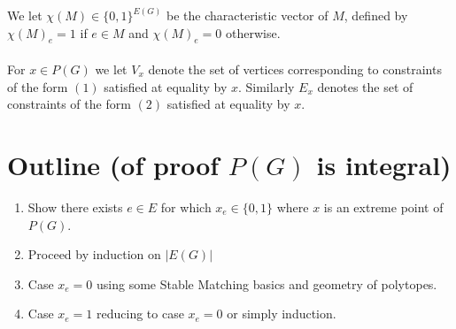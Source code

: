 \documentclass[letterpaper,12pt,oneside,onecolumn]{article}
\begin{document}
\paragraph{}
We let $\chi(M) \in \{0,1\}^{E(G)}$ be the characteristic vector of $M$, defined by $\chi(M)_e = 1$ if $e\in M$ and $\chi(M)_e = 0$ otherwise.
\paragraph{}
For $x \in P(G)$ we let $V_x$ denote the set of vertices corresponding to constraints of the form $(1)$ satisfied at equality by $x$. Similarly $E_x$ denotes the set of constraints of the form $(2)$ satisfied at equality by $x$.
\section*{Outline (of proof $P(G)$ is integral)}
\begin{enumerate}
\item Show there exists $e \in E$ for which $x_e \in \{0,1\}$ where $x$ is an extreme point of $P(G)$.
\item Proceed by induction on $|E(G)|$
\item Case $x_e = 0$ using some Stable Matching basics and geometry of polytopes.
\item Case $x_e = 1$ reducing to case $x_e = 0$ or simply induction.
\end{enumerate}
\end{document}
